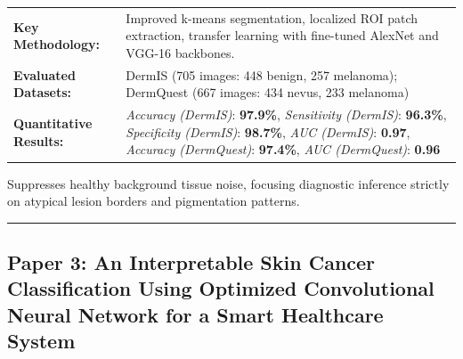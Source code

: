 \documentclass[10pt,a4paper]{article}
\begin{document}
\vspace{4pt}
\begin{tabularx}{\linewidth}{p{3.2cm}X}
\toprule
\textbf{Key Methodology:} & Improved k-means segmentation, localized ROI patch extraction, transfer learning with fine-tuned AlexNet and VGG-16 backbones. \\
\textbf{Evaluated Datasets:} & DermIS (705 images: 448 benign, 257 melanoma); DermQuest (667 images: 434 nevus, 233 melanoma) \\
\textbf{Quantitative Results:} & \textit{Accuracy (DermIS)}: \textbf{97.9\%}, \textit{Sensitivity (DermIS)}: \textbf{96.3\%}, \textit{Specificity (DermIS)}: \textbf{98.7\%}, \textit{AUC (DermIS)}: \textbf{0.97}, \textit{Accuracy (DermQuest)}: \textbf{97.4\%}, \textit{AUC (DermQuest)}: \textbf{0.96} \\
\bottomrule
\end{tabularx}
\vspace{4pt}
\begin{tcolorbox}[utilitybox,title=Clinical Utility and Real-World Impact]
Suppresses healthy background tissue noise, focusing diagnostic inference strictly on atypical lesion borders and pigmentation patterns.
\end{tcolorbox}
\vspace{12pt}
\hrule
\vspace{12pt}
\subsection*{Paper 3: An Interpretable Skin Cancer Classification Using Optimized Convolutional Neural Network for a Smart Healthcare System}
\end{document}
